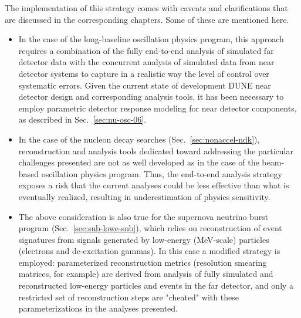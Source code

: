 The implementation of this strategy comes with caveats
and clarifications that are discussed in the corresponding
chapters.  Some of these are mentioned here.
\begin{itemize}
\item In the case of the long-baseline oscillation physics
      program, this approach requires a combination of the 
      fully end-to-end analysis of simulated far detector data
      with the concurrent analysis of simulated data from
      near detector systems to capture in a realistic way 
      the level of 
      control over systematic errors.  Given the 
      current state of development DUNE near detector design and 
      corresponding analysis tools,  it has been necessary to 
      employ parametric detector response modeling for near 
      detector components, as described in
      Sec.~\ref{sec:nu-osc-06}.

\item In the case of the nucleon decay searches
      (Sec.~\ref{sec:nonaccel-ndk}),
      reconstruction and analysis tools dedicated toward
      addressing the particular challenges presented are 
      not as well developed as in the case of the 
      beam-based oscillation physics program.  
      Thus, the end-to-end analysis strategy exposes
      a risk that the current analyses could be  
      less effective than what is eventually realized,
      resulting in underestimation of physics sensitivity.

\item The above consideration is also true for the supernova
      neutrino burst program (Sec.~\ref{sec:snb-lowe-snb}),
      which relies on reconstruction of event signatures
      from \lartpc signals generated by low-energy
      (MeV-scale) particles (electrons and de-excitation gammas).
      In this case a modified strategy is employed:
      parameterized reconstruction metrics (resolution 
      smearing matrices, for example) are derived from
      analysis of fully simulated and reconstructed low-energy 
      particles and events in the far detector, and only 
      a restricted set of reconstruction steps are "cheated" with these parameterizations in the analyses presented.


\end{itemize}
